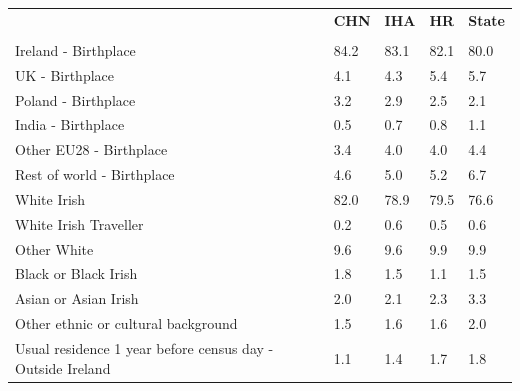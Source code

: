 \documentclass{article}
\begin{document}
\pagebreak
\begin{table}[h]	
\centering
		\begin{tabular}{KTTTT}
  \hline
& \textbf{CHN} & \textbf{IHA} & \textbf{HR}& \textbf{State}\\ 
  \hline
    \\ 
    \hline
Ireland - Birthplace & 84.2& 83.1& 82.1& 80.0\\
UK - Birthplace & 4.1& 4.3& 5.4& 5.7\\
Poland - Birthplace & 3.2& 2.9& 2.5& 2.1\\
India - Birthplace & 0.5& 0.7& 0.8& 1.1\\
Other EU28 - Birthplace & 3.4& 4.0& 4.0& 4.4\\
Rest of world - Birthplace & 4.6& 5.0& 5.2& 6.7\\
    \hline
White Irish & 82.0& 78.9& 79.5& 76.6\\
White Irish Traveller & 0.2& 0.6& 0.5& 0.6\\
Other White & 9.6& 9.6& 9.9& 9.9\\
Black or Black Irish & 1.8& 1.5& 1.1& 1.5\\
Asian or Asian Irish & 2.0& 2.1& 2.3& 3.3\\
Other ethnic or cultural background & 1.5& 1.6& 1.6& 2.0\\
    \hline
Usual residence 1 year before census day - Outside Ireland & 1.1& 1.4& 1.7& 1.8\\


\end{tabular}
\end{table}
\end{document}
